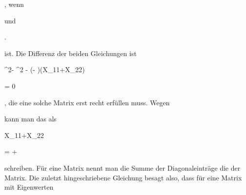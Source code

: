 {\mavergleichskette


{\vergleichskette


{ \lambda
}


{ \neq }{ \delta
}


{  }{
}


{    }{
}


{   }{
}


}
{}{}{,}
wenn


 {  }


und


 { . }


ist. Die Differenz der beiden Gleichungen ist


\mavergleichskettedisp


{\vergleichskette


{ \lambda^2- \delta^2 - (\lambda - \delta)(X_{11}+X_{22})
}


{ =} { 0
}


{ } {
}


{ } {
}


{ } {
}


}
{}{}{,}
die eine solche Matrix erst recht erfüllen muss. Wegen


\mavergleichskette


{\vergleichskette


{ \lambda
}


{ \neq }{ \delta
}


{  }{
}


{    }{
}


{   }{
}


}
{}{}{}
kann man das als


\mavergleichskettedisp


{\vergleichskette


{ X_{11}+X_{22}
}


{ =} { \lambda + \delta
}


{ } {
}


{ } {
}


{ } {
}


}
{}{}{}
schreiben. Für eine Matrix nennt man die Summe der Diagonaleinträge die
der Matrix. Die zuletzt hingeschriebene Gleichung besagt also, dass für eine Matrix mit Eigenwerten


\mavergleichskette


{\vergleichskette


}}
